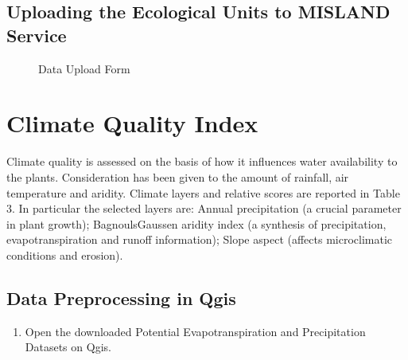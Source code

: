 \documentclass[letterpaper,10pt,english]{sphinxmanual}
\let\sphinxpxdimen\pdfpxdimen\else\newdimen\sphinxpxdimen
\begin{document}
\section{Uploading the Ecological Units to MISLAND Service}
\label{\detokenize{Preprocessing/Ecologicalunits:uploading-the-ecological-units-to-misland-service}}
\begin{figure}[H]
\centering
\capstart

\noindent\sphinxincludegraphics[width=716\sphinxpxdimen,height=608\sphinxpxdimen]{{ecounit7}.png}
\caption{Data Upload Form}\label{\detokenize{Preprocessing/Ecologicalunits:id8}}\end{figure}

\sphinxstepscope


\chapter{Climate Quality Index}
\label{\detokenize{Preprocessing/cqi:climate-quality-index}}\label{\detokenize{Preprocessing/cqi::doc}}
\sphinxAtStartPar
Climate quality is assessed on the basis of how it influences water availability to the plants. Consideration has been given to the amount of rainfall, air temperature and aridity. Climate layers and relative scores are reported in Table 3. In particular the selected layers are: Annual precipitation (a crucial parameter in plant growth); Bagnouls\sphinxhyphen{}Gaussen aridity index (a synthesis of precipitation, evapotranspiration and run\sphinxhyphen{}off information); Slope aspect (affects microclimatic conditions and erosion).


\section{Data Preprocessing in Qgis}
\label{\detokenize{Preprocessing/cqi:data-preprocessing-in-qgis}}\begin{enumerate}
%
\item {} 
\sphinxAtStartPar
Open the downloaded Potential Evapotranspiration and Precipitation Datasets on Qgis.

\end{enumerate}
\end{document}
